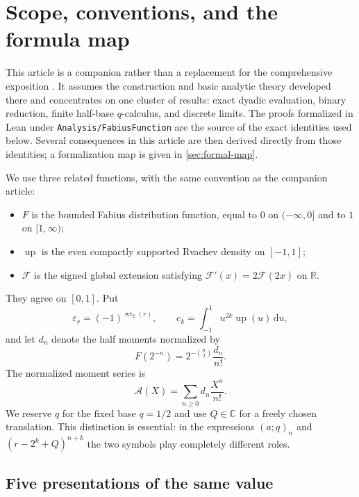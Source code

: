 \documentclass[11pt,oneside]{article}
\theoremstyle{definition}
\theoremstyle{remark}
\newcommand{\R}{\mathbb R}
\newcommand{\C}{\mathbb C}
\newcommand{\Up}{\operatorname{up}}
\newcommand{\wt}{\operatorname{wt}_2}
\newcommand{\dd}{\,\mathrm d}
\newcommand{\repo}{\nolinkurl{Analysis/FabiusFunction}}
\newcommand{\tm}{\varepsilon}
\begin{document}
\tableofcontents
\newpage

\section{Scope, conventions, and the formula map}
\label{sec:scope}

This article is a companion rather than a replacement for the comprehensive exposition
\cite{mainarticle}.  It assumes the construction and basic analytic theory developed there
and concentrates on one cluster of results: exact dyadic evaluation, binary reduction, finite
half-base $q$-calculus, and discrete limits.  The proofs formalized in Lean under \repo
\cite{proveit} are the source of the exact identities used below.  Several consequences in
this article are then derived directly from those identities; a formalization map is given in
\cref{sec:formal-map}.

We use three related functions, with the same convention as the companion article:
\begin{itemize}
\item $F$ is the bounded Fabius distribution function, equal to $0$ on $(-\infty,0]$ and to
      $1$ on $[1,\infty)$;
\item $\Up$ is the even compactly supported Rvachev density on $[-1,1]$;
\item $\mathcal F$ is the signed global extension satisfying
      $\mathcal F'(x)=2\mathcal F(2x)$ on $\R$.
\end{itemize}
They agree on $[0,1]$.  Put
\[
 \tm_r=(-1)^{\wt(r)},\qquad
 c_k=\int_{-1}^{1}u^{2k}\Up(u)\dd u,
\]
and let $d_n$ denote the half moments normalized by
\begin{equation}
 F(2^{-n})=2^{-\binom n2}\frac{d_n}{n!}.                 \label{eq:inverse-dyadic-input}
\end{equation}
The normalized moment series is
\begin{equation}
 \mathscr A(X)=\sum_{n\ge0}d_n\frac{X^n}{n!}.             \label{eq:A-def}
\end{equation}
We reserve $q$ for the fixed base $q=1/2$ and use $Q\in\C$ for a freely chosen translation.
This distinction is essential: in the expressions $(a;q)_n$ and
$(r-2^k+Q)^{n+k}$ the two symbols play completely different roles.

\subsection{Five presentations of the same value}
\end{document}
